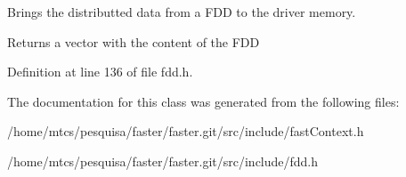 Brings the distributted data from a F\+DD to the driver memory. 

\begin{DoxyReturn}{Returns}
a vector with the content of the F\+DD 
\end{DoxyReturn}


Definition at line 136 of file fdd.\+h.



The documentation for this class was generated from the following files\+:\begin{DoxyCompactItemize}
\item 
/home/mtcs/pesquisa/faster/faster.\+git/src/include/fast\+Context.\+h\item 
/home/mtcs/pesquisa/faster/faster.\+git/src/include/fdd.\+h\end{DoxyCompactItemize}
